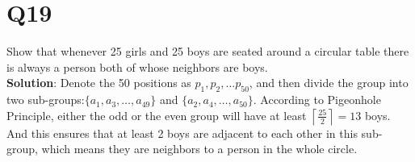 \documentclass[a4paper,11pt]{article}
\newenvironment{solution}{{\\\bf Solution}:}{\smallskip}
\begin{document}
\section*{Q19}
Show that whenever 25 girls and 25 boys are seated around a circular table there is always a person both of whose neighbors are boys.
\begin{solution}
    Denote the 50 positions as $p_1,p_2, \ldots p_{50}$, and then 
    divide the group into two sub-groups:$\{ a_1,a_3, \ldots ,a_{49} \}$
    and $\{ a_2,a_4, \ldots ,a_{50} \}$. According to Pigeonhole Principle,
    either the odd or the even group will have at least
    $\left\lceil \frac{25}{2} \right\rceil =13$ boys. And this ensures 
    that at least 2 boys are adjacent to each other in this sub-group, 
    which means they are neighbors to a person in the whole circle.
\end{solution}
\end{document}
